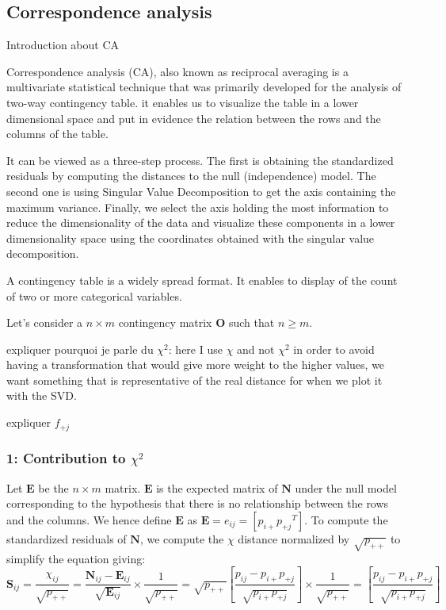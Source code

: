\documentclass{article}
\begin{document}
\subsection{Correspondence analysis}

Introduction about CA

Correspondence analysis (CA), also known as reciprocal averaging is a multivariate statistical technique that was primarily developed for the analysis of two-way contingency table. it enables us to visualize the table in a lower dimensional space and put in evidence the relation between the rows and the columns of the table.

It can be viewed as a three-step process. The first is obtaining the standardized residuals by computing the distances to the null (independence) model. The second one is using Singular Value Decomposition to get the axis containing the maximum variance. Finally, we select the axis holding the most information to reduce the dimensionality of the data and visualize these components in a lower dimensionality space using the coordinates obtained with the singular value decomposition.




A contingency table is a widely spread format. It enables to display of the count of two or more categorical variables.

Let's consider a $n \times m$ contingency matrix $\textbf{O}$ such that $n\geq m$.

expliquer pourquoi je parle du $\chi^2$:
here I use $\chi$ and not $\chi^2$ in order to avoid having a transformation that would give more weight to the higher values, we want something that is representative of the real distance for when we plot it with the SVD.

expliquer ${f_{+j}}$

\subsubsection{1: Contribution to $\chi^2$}

Let $\textbf{E}$ be the $n\times m$ matrix. $\textbf{E}$ is the expected matrix of  $\textbf{N}$ under the null model corresponding to the hypothesis that there is no relationship between the rows and the columns. We hence define $\textbf{E}$ as $\textbf{E} = e_{ij} = [p_{i+}{p_{+j}}^T]$.
To compute the standardized residuals of $\textbf{N}$, we compute the $\chi$ distance normalized by $\sqrt{p_{++}}$ to simplify the equation giving:
$$\textbf{S}_{ij} = \frac{\chi_{ij}}{\sqrt{p_{++}}} = \frac{\textbf{N}_{ij} -  \textbf{E}_{ij}}{\sqrt{\textbf{E}_{ij}}} \times \frac{1}{\sqrt{p_{++}}} = \sqrt{p_{++}} \left[ \frac{p_{ij} - p_{i+}p_{+j}}{\sqrt{p_{i+}p_{+j}}} \right] \times \frac{1}{\sqrt{p_{++}}} = \left[ \frac{p_{ij} - p_{i+}p_{+j}}{\sqrt{p_{i+}p_{+j}}} \right]$$ 
\end{document}
